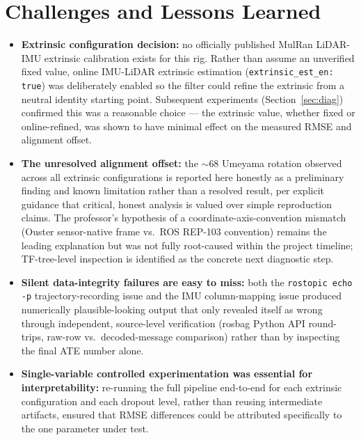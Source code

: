 \documentclass[conference]{IEEEtran}
\begin{document}
\section{Challenges and Lessons Learned}

\begin{itemize}
\item \textbf{Extrinsic configuration decision:} no officially published MulRan LiDAR-IMU extrinsic calibration exists for this rig. Rather than assume an unverified fixed value, online IMU-LiDAR extrinsic estimation (\texttt{extrinsic\_est\_en: true}) was deliberately enabled so the filter could refine the extrinsic from a neutral identity starting point. Subsequent experiments (Section~\ref{sec:diag}) confirmed this was a reasonable choice --- the extrinsic value, whether fixed or online-refined, was shown to have minimal effect on the measured RMSE and alignment offset.
\item \textbf{The unresolved alignment offset:} the $\sim$68\textdegree{} Umeyama rotation observed across all extrinsic configurations is reported here honestly as a preliminary finding and known limitation rather than a resolved result, per explicit guidance that critical, honest analysis is valued over simple reproduction claims. The professor's hypothesis of a coordinate-axis-convention mismatch (Ouster sensor-native frame vs.\ ROS REP-103 convention) remains the leading explanation but was not fully root-caused within the project timeline; TF-tree-level inspection is identified as the concrete next diagnostic step.
\item \textbf{Silent data-integrity failures are easy to miss:} both the \texttt{rostopic echo -p} trajectory-recording issue and the IMU column-mapping issue produced numerically plausible-looking output that only revealed itself as wrong through independent, source-level verification (rosbag Python API round-trips, raw-row vs.\ decoded-message comparison) rather than by inspecting the final ATE number alone.
\item \textbf{Single-variable controlled experimentation was essential for interpretability:} re-running the full pipeline end-to-end for each extrinsic configuration and each dropout level, rather than reusing intermediate artifacts, ensured that RMSE differences could be attributed specifically to the one parameter under test.
\end{itemize}
\end{document}
